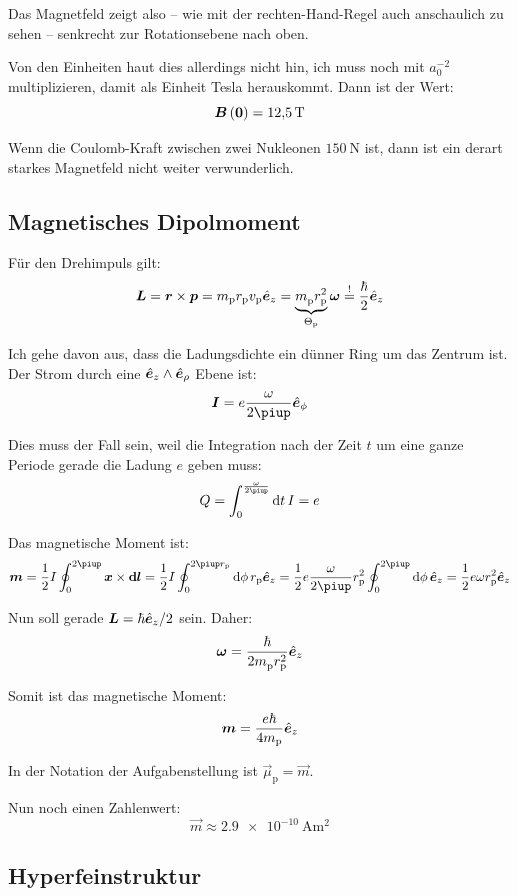 Das Magnetfeld zeigt also – wie mit der rechten-Hand-Regel auch anschaulich zu
sehen – senkrecht zur Rotationsebene nach oben.

Von den Einheiten haut dies allerdings nicht hin, ich muss noch mit $a_0^{-2}$
multiplizieren, damit als Einheit Tesla herauskommt. Dann ist der Wert:
\[
	\vec B\del{\vec 0} = \SI{12.5}\tesla
\]

Wenn die Coulomb-Kraft zwischen zwei Nukleonen $\SI{150}\newton$ ist, dann ist
ein derart starkes Magnetfeld nicht weiter verwunderlich.

\subsection{Magnetisches Dipolmoment}

Für den Drehimpuls gilt:
\[
	\boldsymbol{L}
	= \boldsymbol{r} \times \boldsymbol{p}
	= m_\text{p} r_\text{p} v_\text{p} \hat{\boldsymbol{e}}_z
	= \underbrace{m_\text{p}^{} r_\text{p}^2}_{\Theta_\text{p}} \boldsymbol{\omega}
	\overset != \frac\hbar2 \hat{\boldsymbol{e}}_z
\]

Ich gehe davon aus, dass die Ladungsdichte ein dünner Ring um das Zentrum ist.
Der Strom durch eine $\hat{\boldsymbol{e}}_z \wedge \hat{\boldsymbol{e}}_\rho$ Ebene ist:
\[
	\vec I = e \frac{\omega}{2\piup} \ev_\phi
\]

Dies muss der Fall sein, weil die Integration nach der Zeit $t$ um eine ganze
Periode gerade die Ladung $e$ geben muss:
\[
	Q = \int_0^{\frac\omega{2\piup}} \dif t \, I = e
\]

Das magnetische Moment ist:
\[
	\vec m
	= \half I \oint_0^{2\piup} \vec x \times \vec{\dif l}
	= \half I \oint_0^{2\piup r_\text{p}} \dif \phi \, r_\text{p} \ev_z
	= \half e \frac{\omega}{2\piup} r_\text{p}^2 \oint_0^{2\piup} \dif \phi \, \ev_z
	= \half e \omega r_\text{p}^2 \ev_z
\]

Nun soll gerade $\boldsymbol{L} = \hbar \hat{\boldsymbol{e}}_z /2$ sein. Daher:
\[
	\boldsymbol{\omega} = \frac{\hbar}{2 m_\text{p}^{} r_\text{p}^2} \hat{\boldsymbol{e}}_z
\]

Somit ist das magnetische Moment:
\[
	\boldsymbol{m} = \frac{e \hbar}{4 m_\text{p}} \hat{\boldsymbol{e}}_z
\]

In der Notation der Aufgabenstellung ist $\vec \mu_\text{p} = \vec m$.

Nun noch einen Zahlenwert:
\[
	\vec m \approx \SI{2.9e-10}{\ampere\meter\squared}
\]

\subsection{Hyperfeinstruktur}

